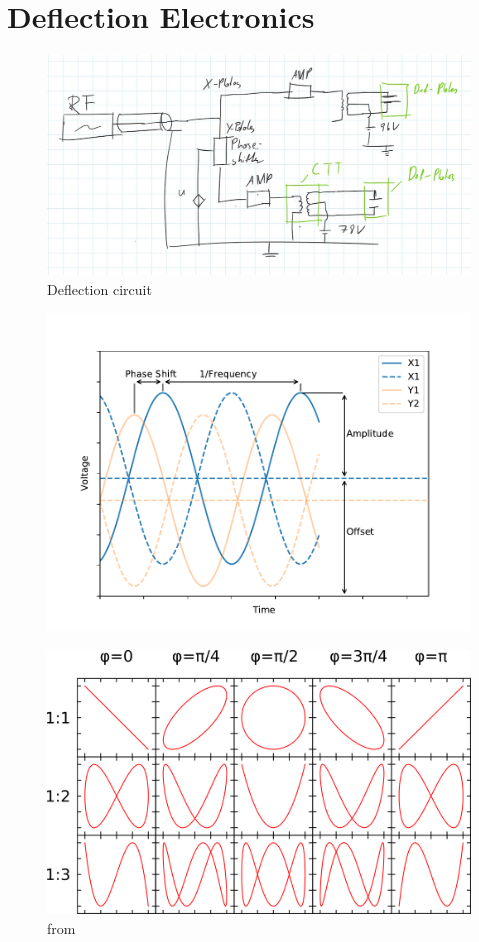 
\chapter{Deflection Electronics}

\begin{figure}
	\centering
	\includegraphics[width=0.7\linewidth]{Chapters/Deflection/deflec_circuit}
	\caption{Deflection circuit}
	\label{fig:defleccircuit}
\end{figure}

\begin{figure}
	\centering
	\includegraphics[width=0.7\linewidth]{Chapters/Deflection/VoltageAspects}
	\caption{}
	\label{fig:VoltageAspects}
\end{figure}

\begin{figure}
	\centering
	\includegraphics[width=0.7\linewidth]{Chapters/Deflection/Lissajous}
	\caption{ from \cite{Wikipedia Lissajous}}
	\label{fig:Lissajous}
\end{figure}




